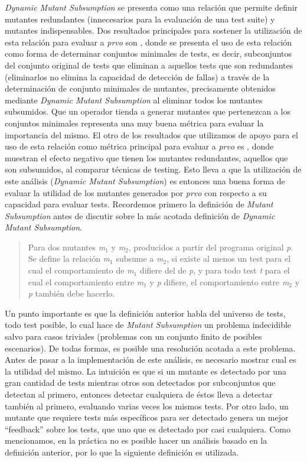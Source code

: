 \emph{Dynamic Mutant Subsumption} se presenta como una relaci\'on que permite definir mutantes redundantes (innecesarios para la evaluaci\'on de una test suite) y mutantes indispensables. Dos resultados principales para sostener la utilizaci\'on de esta relaci\'on para evaluar a \emph{prvo} son \cite{bibliography.mutation.minimizing.dynamicsubsumption}, donde se presenta el uso de esta relaci\'on como forma de determinar conjuntos minimales de tests, es decir, subconjuntos del conjunto original de tests que eliminan a aquellos tests que son redundantes (eliminarlos no elimina la capacidad de detecci\'on de fallas) a través de la determinaci\'on de conjunto minimales de mutantes, precisamente obtenidos mediante \emph{Dynamic Mutant Subsumption} al eliminar todos los mutantes subsumidos. Que un operador tienda a generar mutantes que pertenezcan a los conjuntos minimales representa una muy buena m\'etrica para evaluar la importancia del mismo. El otro de los resultados que utilizamos de apoyo para el uso de esta relaci\'on como m\'etrica principal para evaluar a \emph{prvo} es \cite{bibliography.mutation.evaluation.PapadakisHHJT16}, donde muestran el efecto negativo que tienen los mutantes redundantes, aquellos que son subsumidos, al comparar t\'ecnicas de testing. Esto lleva a que la utilizaci\'on de este an\'alisis (\emph{Dynamic Mutant Subsumption}) es entonces una buena forma de evaluar la utilidad de los mutantes generados por \emph{prvo} con respecto a su capacidad para evaluar tests.
Recordemos primero la definici\'on de \emph{Mutant Subsumption} antes de discutir sobre la m\'as acotada definici\'on de \emph{Dynamic Mutant Subsumption}.
\begin{quote}
	Para dos mutantes \emph{m$_1$} y \emph{m$_2$}, producidos a partir del programa original \emph{p}. Se define la relaci\'on \emph{m$_1$} subsume a \emph{m$_2$}, si existe al menos un test para el cual el comportamiento de \emph{m$_1$} difiere del de \emph{p}, y para todo test \emph{t} para el cual el comportamiento entre \emph{m$_1$} y \emph{p} difiere, el comportamiento entre \emph{m$_2$} y \emph{p} tambi\'en debe hacerlo.
\end{quote}
Un punto importante es que la definici\'on anterior habla del universo de tests, todo test posible, lo cual hace de \emph{Mutant Subsumption} un problema indecidible salvo para casos triviales (problemas con un conjunto finito de posibles escenarios). De todas formas, es posible una resoluci\'on acotada a este problema. Antes de pasar a la implementaci\'on de este an\'alisis, es necesario mostrar cual es la utilidad del mismo. La intuici\'on es que si un mutante es detectado por una gran cantidad de tests mientras otros son detectados por subconjuntos que detectan al primero, entonces detectar cualquiera de \'estos lleva a detectar tambi\'en al primero, evaluando varias veces los mismos tests. Por otro lado, un mutante que requiere tests m\'as espec\'ificos para ser detectado genera un mejor ``feedback'' sobre los tests, que uno que es detectado por casi cualquiera. Como mencionamos, en la pr\'actica no es posible hacer un an\'alisis basado en la definici\'on anterior, por lo que la siguiente definici\'on es utilizada.
